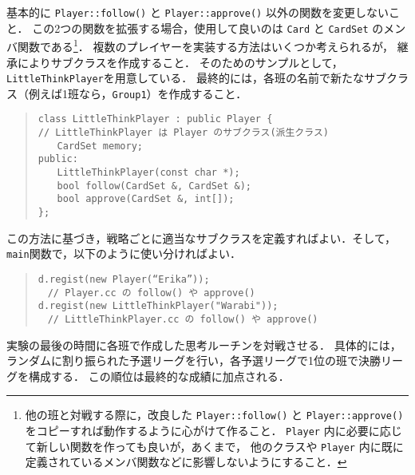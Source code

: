 基本的に \verb+Player::follow()+ と \verb+Player::approve()+ 以外の関数を変更しないこと．
この2つの関数を拡張する場合，使用して良いのは \verb+Card+ と  \verb+CardSet+ のメンバ関数である\footnote{他の班と対戦する際に，改良した \verb+Player::follow()+ と \verb+Player::approve()+ をコピーすれば動作するように心がけて作ること． \verb+Player+ 内に必要に応じて新しい関数を作っても良いが，あくまで， 他のクラスや \verb+Player+ 内に既に定義されているメンバ関数などに影響しないようにすること．}．
複数のプレイヤーを実装する方法はいくつか考えられるが，
継承によりサブクラスを作成すること．
そのためのサンプルとして，\verb+LittleThinkPlayer+を用意している．
最終的には，各班の名前で新たなサブクラス（例えば1班なら，\verb+Group1+）を作成すること．
\begin{quote}
\begin{verbatim}
class LittleThinkPlayer : public Player {
// LittleThinkPlayer は Player のサブクラス(派生クラス)
　　CardSet memory;
public:
　　LittleThinkPlayer(const char *);
　　bool follow(CardSet &, CardSet &);
　　bool approve(CardSet &, int[]);
};
\end{verbatim}
\end{quote}
この方法に基づき，戦略ごとに適当なサブクラスを定義すればよい．そして，\verb+main+関数で，以下のように使い分ければよい．
\begin{quote}
\begin{verbatim}
d.regist(new Player(“Erika”)); 　
　// Player.cc の follow() や approve() 
d.regist(new LittleThinkPlayer("Warabi")); 
　// LittleThinkPlayer.cc の follow() や approve() 
\end{verbatim}
\end{quote}

実験の最後の時間に各班で作成した思考ルーチンを対戦させる．
具体的には，ランダムに割り振られた予選リーグを行い，各予選リーグで1位の班で決勝リーグを構成する．
この順位は最終的な成績に加点される．

